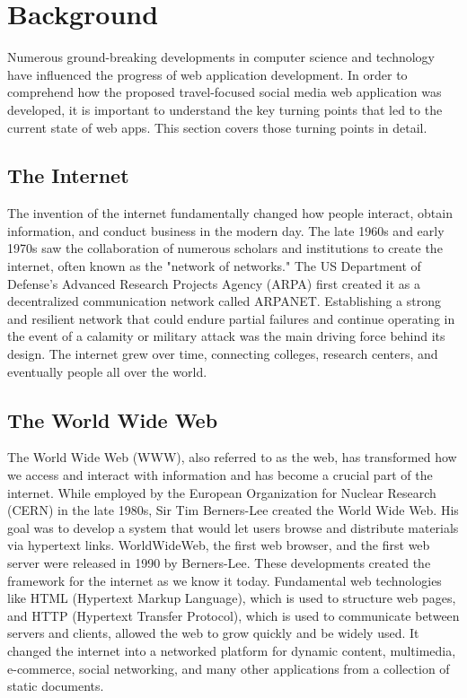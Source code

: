 \section{Background}

\par Numerous ground-breaking developments in computer science and technology have influenced the progress of web application development. In order to comprehend how the proposed travel-focused social media web application was developed, it is important to understand the key turning points that led to the current state of web apps. This section covers those turning points in detail.


\subsection{The Internet}

\par The invention of the internet fundamentally changed how people interact, obtain information, and conduct business in the modern day. The late 1960s and early 1970s saw the collaboration of numerous scholars and institutions to create the internet, often known as the "network of networks." The US Department of Defense's Advanced Research Projects Agency (ARPA) first created it as a decentralized communication network called ARPANET. Establishing a strong and resilient network that could endure partial failures and continue operating in the event of a calamity or military attack was the main driving force behind its design. The internet grew over time, connecting colleges, research centers, and eventually people all over the world. \cite{Cerf1974}

\subsection{The World Wide Web}

\par The World Wide Web (WWW), also referred to as the web, has transformed how we access and interact with information and has become a crucial part of the internet. While employed by the European Organization for Nuclear Research (CERN) in the late 1980s, Sir Tim Berners-Lee created the World Wide Web. His goal was to develop a system that would let users browse and distribute materials via hypertext links. WorldWideWeb, the first web browser, and the first web server were released in 1990 by Berners-Lee. These developments created the framework for the internet as we know it today. Fundamental web technologies like HTML (Hypertext Markup Language), which is used to structure web pages, and HTTP (Hypertext Transfer Protocol), which is used to communicate between servers and clients, allowed the web to grow quickly and be widely used. It changed the internet into a networked platform for dynamic content, multimedia, e-commerce, social networking, and many other applications from a collection of static documents. \cite{Berners1999}

